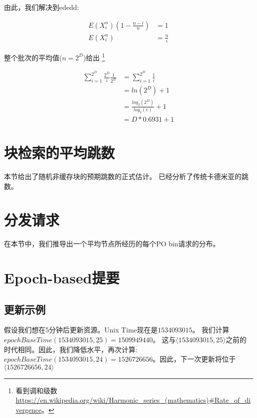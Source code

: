由此，我们解决到ededd:

 \begin{subequations}   \begin{align}
\mathit{E}(X^n_i)(1-\frac{n-i}{n})&=1\\
\mathit{E}(X^n_i)&=\frac{n}{i}
\end{align} \end{subequations}

整个批次的平均值($n=2^D$)给出%
%
\footnote{看到调和级数 
\url{https://en.wikipedia.org/wiki/Harmonic\_series\_(mathematics)\#Rate\_of\_divergence}。}

 \begin{subequations}   \begin{align}
\sum_{i=1}^{2^D}\frac{2^D}{i}\frac{1}{2^D}
&=\sum_{i=1}^{2^D}\frac{1}{i}\\
&=\mathit{ln}(2^D)+1\\
&=\frac{\mathit{log}_2(2^D)}{\mathit{log}_2(e)}+1\\
&=D*0.6931+1
\end{align} \end{subequations}

\section{块检索的平均跳数}

本节给出了随机非缓存块的预期跳数的正式估计。  
\cite{roos2013comprehending, roos2015determining}已经分析了传统卡德米亚的跳数。

\section{分发请求}

在本节中，我们推导出一个平均节点所经历的每个PO bin请求的分布。

\section{Epoch-based提要\statusgreen}\label{sec:epoch-based-feeds-appendix}
\subsection*{更新示例\statusgreen}
 
假设我们想在5分钟后更新资源。Unix Time现在是$1534093015$。
我们计算$\mathit{epochBaseTime}(1534093015, 25) = 1509949440$。
这与$\langle  1534093015, 25\rangle$之前的时代相同。因此，我们降低水平，再次计算:
$\mathit{epochBaseTime}(1534093015, 24) = 1526726656$。因此，下一次更新将位于$\langle  1526726656, 24\rangle$

